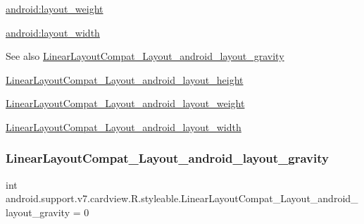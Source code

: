 {\ttfamily \hyperlink{classandroid_1_1support_1_1v7_1_1cardview_1_1R_1_1styleable_a576511bf33bbd8148b568b3262bb45ab}{android\+:layout\+\_\+weight}}

{\ttfamily \hyperlink{classandroid_1_1support_1_1v7_1_1cardview_1_1R_1_1styleable_ad6fbb71f28fd79d9a51d3b100d80b56f}{android\+:layout\+\_\+width}}

\begin{DoxySeeAlso}{See also}
\hyperlink{classandroid_1_1support_1_1v7_1_1cardview_1_1R_1_1styleable_a87d2342b6ef4ee1fad3dff9b4d492976}{Linear\+Layout\+Compat\+\_\+\+Layout\+\_\+android\+\_\+layout\+\_\+gravity} 

\hyperlink{classandroid_1_1support_1_1v7_1_1cardview_1_1R_1_1styleable_af747baf1f87dcca03c3b8c31979c4045}{Linear\+Layout\+Compat\+\_\+\+Layout\+\_\+android\+\_\+layout\+\_\+height} 

\hyperlink{classandroid_1_1support_1_1v7_1_1cardview_1_1R_1_1styleable_a576511bf33bbd8148b568b3262bb45ab}{Linear\+Layout\+Compat\+\_\+\+Layout\+\_\+android\+\_\+layout\+\_\+weight} 

\hyperlink{classandroid_1_1support_1_1v7_1_1cardview_1_1R_1_1styleable_ad6fbb71f28fd79d9a51d3b100d80b56f}{Linear\+Layout\+Compat\+\_\+\+Layout\+\_\+android\+\_\+layout\+\_\+width} 
\end{DoxySeeAlso}
\mbox{\label{classandroid_1_1support_1_1v7_1_1cardview_1_1R_1_1styleable_a87d2342b6ef4ee1fad3dff9b4d492976}} 
\subsubsection{\texorpdfstring{Linear\+Layout\+Compat\+\_\+\+Layout\+\_\+android\+\_\+layout\+\_\+gravity}{LinearLayoutCompat\_Layout\_android\_layout\_gravity}}
{\footnotesize\ttfamily int android.\+support.\+v7.\+cardview.\+R.\+styleable.\+Linear\+Layout\+Compat\+\_\+\+Layout\+\_\+android\+\_\+layout\+\_\+gravity = 0\hspace{0.3cm}{\ttfamily [static]}}

